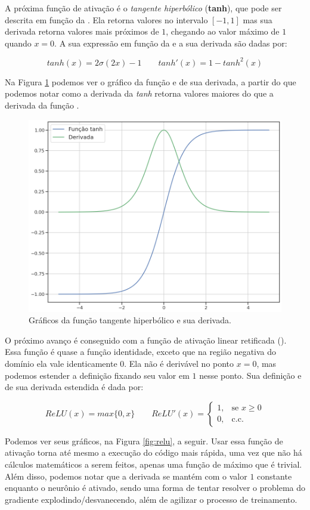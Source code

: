A próxima função de ativação é o \emph{tangente hiperbólico} (\textbf{tanh}), que pode ser descrita em função da . Ela retorna valores no intervalo $[-1, 1]$ mas sua derivada retorna valores mais próximos de $1$, chegando ao valor máximo de $1$ quando $x = 0$. A sua expressão em função da  e a sua derivada são dadas por:

\[ tanh(x)=2\sigma(2x) - 1   \quad \quad  tanh'(x)=1 - tanh^2(x) \]

Na Figura \ref{fig:tanh} podemos ver o gráfico da função e de sua derivada, a partir do que podemos notar como a derivada da \emph{tanh} retorna valores maiores do que a derivada da função .

\begin{figure}[htb]
\centering
\includegraphics[width=12cm]{figuras/tanh}
\caption{Gráficos da função tangente hiperbólico e sua derivada.}
\label{fig:tanh}
\end{figure}

O próximo avanço é conseguido com a função de ativação linear retificada (). Essa função é quase a função identidade, exceto que na região negativa do domínio ela vale identicamente $0$. Ela não é derivável no ponto $x=0$, mas podemos estender a definição fixando seu valor em $1$ nesse ponto. Sua definição e de sua derivada estendida é dada por:

\[
ReLU(x)=max\{0, x\}   \quad \quad  ReLU'(x)=
	\begin{cases}
    	1, & \text{se } x\ge 0\\
    	0, & \text{c.c.}
	\end{cases}
\]

Podemos ver seus gráficos, na Figura \ref{fig:relu}, a seguir. Usar essa função de ativação torna até mesmo a execução do código mais rápida, uma vez que não há cálculos matemáticos a serem feitos, apenas uma função de máximo que é trivial. Além disso, podemos notar que a derivada se mantém com o valor $1$ constante enquanto o neurônio é ativado, sendo uma forma de tentar resolver o problema do gradiente explodindo/desvanecendo, além de agilizar o processo de treinamento. 

